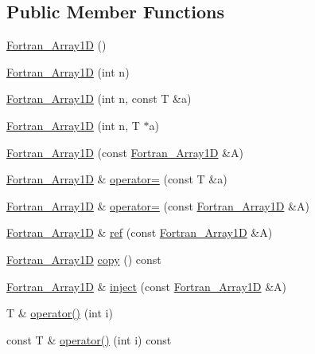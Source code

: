 \subsection*{Public Member Functions}
\begin{DoxyCompactItemize}
\item 
\hyperlink{classTNT_1_1Fortran__Array1D_a8fade001c69d8de5c1dcbe578a334601}{Fortran\-\_\-\-Array1\-D} ()
\item 
\hyperlink{classTNT_1_1Fortran__Array1D_a44e447a75b9dfb163cb8262ac98e0f30}{Fortran\-\_\-\-Array1\-D} (int n)
\item 
\hyperlink{classTNT_1_1Fortran__Array1D_afce3a6a4930dbb0f4f4abcf6096108e0}{Fortran\-\_\-\-Array1\-D} (int n, const T \&a)
\item 
\hyperlink{classTNT_1_1Fortran__Array1D_ab15dda718952736b1c4ab0ae3821d301}{Fortran\-\_\-\-Array1\-D} (int n, T $\ast$a)
\item 
\hyperlink{classTNT_1_1Fortran__Array1D_a015f19a79b872d0b1097494656ea4c2d}{Fortran\-\_\-\-Array1\-D} (const \hyperlink{classTNT_1_1Fortran__Array1D}{Fortran\-\_\-\-Array1\-D} \&A)
\item 
\hyperlink{classTNT_1_1Fortran__Array1D}{Fortran\-\_\-\-Array1\-D} \& \hyperlink{classTNT_1_1Fortran__Array1D_ab6b262818e08afe5401fb8edbb12a00d}{operator=} (const T \&a)
\item 
\hyperlink{classTNT_1_1Fortran__Array1D}{Fortran\-\_\-\-Array1\-D} \& \hyperlink{classTNT_1_1Fortran__Array1D_a22a2465c8ca9540e588a3b3d3824f303}{operator=} (const \hyperlink{classTNT_1_1Fortran__Array1D}{Fortran\-\_\-\-Array1\-D} \&A)
\item 
\hyperlink{classTNT_1_1Fortran__Array1D}{Fortran\-\_\-\-Array1\-D} \& \hyperlink{classTNT_1_1Fortran__Array1D_a76788e78e69238822450782be69f851d}{ref} (const \hyperlink{classTNT_1_1Fortran__Array1D}{Fortran\-\_\-\-Array1\-D} \&A)
\item 
\hyperlink{classTNT_1_1Fortran__Array1D}{Fortran\-\_\-\-Array1\-D} \hyperlink{classTNT_1_1Fortran__Array1D_ad67336a534b20fa2a55cb60c9aaff2de}{copy} () const 
\item 
\hyperlink{classTNT_1_1Fortran__Array1D}{Fortran\-\_\-\-Array1\-D} \& \hyperlink{classTNT_1_1Fortran__Array1D_aef0affac0190dd180ac3ee56cccbcffb}{inject} (const \hyperlink{classTNT_1_1Fortran__Array1D}{Fortran\-\_\-\-Array1\-D} \&A)
\item 
T \& \hyperlink{classTNT_1_1Fortran__Array1D_a63779e6fa851280f20e41f5c36bf62c1}{operator()} (int i)
\item 
const T \& \hyperlink{classTNT_1_1Fortran__Array1D_ab7136972ebd6a6ccd43e9352054f9d1a}{operator()} (int i) const 

\end{DoxyCompactItemize}
